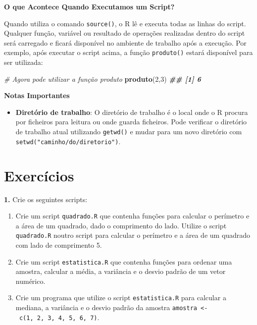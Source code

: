 \documentclass[
]{book}
\newenvironment{Shaded}{\begin{snugshade}}{\end{snugshade}}
\newcommand{\CommentTok}[1]{\textcolor[rgb]{0.56,0.35,0.01}{\textit{#1}}}
\newcommand{\DecValTok}[1]{\textcolor[rgb]{0.00,0.00,0.81}{#1}}
\newcommand{\DocumentationTok}[1]{\textcolor[rgb]{0.56,0.35,0.01}{\textbf{\textit{#1}}}}
\newcommand{\FunctionTok}[1]{\textcolor[rgb]{0.13,0.29,0.53}{\textbf{#1}}}
\newcommand{\NormalTok}[1]{#1}
\providecommand{\tightlist}{%
  \setlength{\itemsep}{0pt}\setlength{\parskip}{0pt}}
\begin{document}
\textbf{O que Acontece Quando Executamos um Script?}

Quando utiliza o comando \texttt{source()}, o R lê e executa todas as linhas do
script. Qualquer função, variável ou resultado de operações realizadas
dentro do script será carregado e ficará disponível no ambiente de
trabalho após a execução. Por exemplo, após executar o script acima, a
função \texttt{produto()} estará disponível para ser utilizada:

\begin{Shaded}
\begin{Highlighting}[]
\CommentTok{\# Agora pode utilizar a função \textquotesingle{}produto\textquotesingle{}}
\FunctionTok{produto}\NormalTok{(}\DecValTok{2}\NormalTok{,}\DecValTok{3}\NormalTok{)}
\DocumentationTok{\#\# [1] 6}
\end{Highlighting}
\end{Shaded}

\textbf{Notas Importantes}

\begin{itemize}
\tightlist
\item
  \textbf{Diretório de trabalho}: O diretório de trabalho é o local onde o
  R procura por ficheiros para leitura ou onde guarda ficheiros. Pode
  verificar o diretório de trabalho atual utilizando \texttt{getwd()} e mudar
  para um novo diretório com \texttt{setwd("caminho/do/diretorio")}.
\end{itemize}

\section{Exercícios}\label{exercuxedcios-8}

\textbf{1.} Crie os seguintes scripts:

\begin{enumerate}
\def\labelenumi{(\alph{enumi})}
\item
  Crie um script \texttt{quadrado.R} que contenha funções para calcular o
  perímetro e a área de um quadrado, dado o comprimento do lado.
  Utilize o script \texttt{quadrado.R} noutro script para calcular o
  perímetro e a área de um quadrado com lado de comprimento 5.
\item
  Crie um script \texttt{estatistica.R} que contenha funções para ordenar uma
  amostra, calcular a média, a variância e o desvio padrão de um vetor
  numérico.
\item
  Crie um programa que utilize o script \texttt{estatistica.R} para calcular
  a mediana, a variância e o desvio padrão da amostra
  \texttt{amostra\ \textless{}-\ c(1,\ 2,\ 3,\ 4,\ 5,\ 6,\ 7)}.
\end{enumerate}
\end{document}
